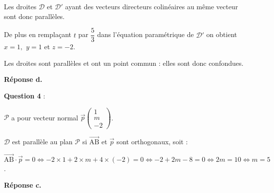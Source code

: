 \documentclass[10pt]{article}
\providecommand{\vect}[1]{\overrightarrow{#1}}
\begin{document}
Les droites $\mathcal{D}$ et $\mathcal{D}'$ ayant des vecteurs directeurs colinéaires au même vecteur sont donc parallèles.

De plus en remplaçant $t$ par $\dfrac{5}{3}$ dans l'équation paramétrique de $\mathcal{D}'$ on obtient $x = 1,~\, y = 1$ et $z = - 2$.

Les droites sont parallèles et ont un point commun : elles sont donc confondues.

\smallskip

\hfill\textbf{Réponse d.}

\medskip

\textbf{Question 4} : 





$\mathcal{P}$ a pour vecteur normal $\vect{p}\begin{pmatrix}1\\m\\-2\end{pmatrix}$.

$\mathcal{D}$ est parallèle au plan $\mathcal{P}$ si $\vect{\text{AB}}$ et $\vect{p}$ sont orthogonaux, soit :

$\vect{\text{AB}} \cdot \vect{p} = 0 \iff -2 \times 1 + 2 \times m + 4 \times (- 2) = 0 \iff - 2 + 2m - 8 = 0 \iff 2m = 10 \iff m = 5$. 

\smallskip

\hfill\textbf{Réponse c.}

\medskip

\bigskip
\end{document}
